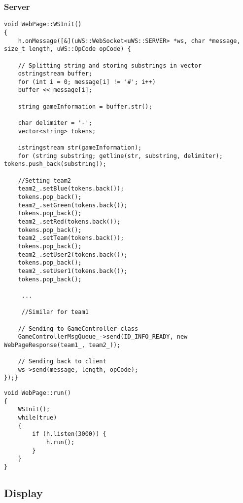 \documentclass[Softwaredesign/Softwaredesign_main.tex]{subfiles}
\begin{document}
\subsubsection{Server}
\begin{lstlisting}[caption={Initering af WebSocket}, label=list:WSInit]
void WebPage::WSInit()
{
	h.onMessage([&](uWS::WebSocket<uWS::SERVER> *ws, char *message, size_t length, uWS::OpCode opCode) {

	// Splitting string and storing substrings in vector
	ostringstream buffer;
	for (int i = 0; message[i] != '#'; i++)
	buffer << message[i];

	string gameInformation = buffer.str();

	char delimiter = '-';
	vector<string> tokens;

	istringstream str(gameInformation);
	for (string substring; getline(str, substring, delimiter); tokens.push_back(substring));

	//Setting team2
	team2_.setBlue(tokens.back());
	tokens.pop_back();
	team2_.setGreen(tokens.back());
	tokens.pop_back();
	team2_.setRed(tokens.back());
	tokens.pop_back();
	team2_.setTeam(tokens.back());
	tokens.pop_back();
	team2_.setUser2(tokens.back());
	tokens.pop_back();
	team2_.setUser1(tokens.back());
	tokens.pop_back();

     ...
        
     //Similar for team1
        
	// Sending to GameController class
	GameControllerMsgQueue_->send(ID_INFO_READY, new WebPageResponse(team1_, team2_));

	// Sending back to client
	ws->send(message, length, opCode);
});}
\end{lstlisting}

\begin{lstlisting}[caption={Run() funktion for WebPage}, label=list:webpage_run]
void WebPage::run()
{
	WSInit();
	while(true)
	{
	    if (h.listen(3000)) {
			h.run();
		}
	}
}
\end{lstlisting}



\subsection{Display}
\end{document}
